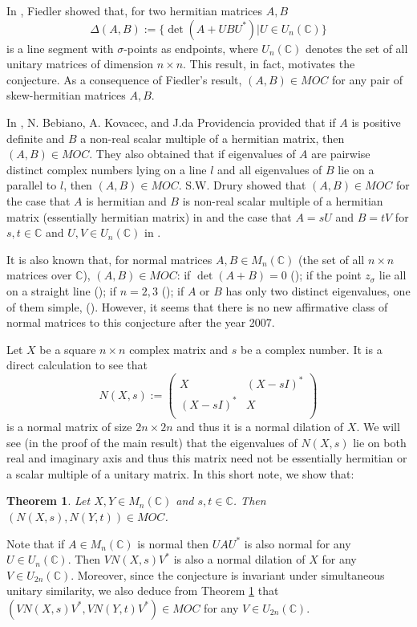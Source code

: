 \documentclass[11pt]{amsart}
\numberwithin{equation}{section}
\newtheorem{thm}{Theorem}[section]
\numberwithin{equation}{section}
\begin{document}
In \cite{Fiedler}, Fiedler showed that, for two hermitian matrices $A,B$ $$\Delta(A,B):=\{\det(A+UBU^*)| U\in U_n(\mathbb{C})\}$$ is a line segment with $\sigma$-points as endpoints, where $U_n(\mathbb{C})$ denotes the set of all unitary matrices of dimension $n \times n$.  This result, in fact, motivates the conjecture.  As a consequence of Fiedler's result, $(A,B)\in MOC$ for any pair of skew-hermitian matrices $A,B$. 

In \cite{BEKOPRO}, N. Bebiano, A. Kovacec, and J.da Providencia provided that if $A$ is positive definite and $B$ a non-real scalar multiple of a hermitian matrix, then $(A,B)\in MOC$.  They also obtained that if eigenvalues of $A$ are pairwise distinct complex numbers lying on a line $l$ and all eigenvalues of $B$ lie on a parallel to $l$, then $(A,B)\in MOC$. S.W. Drury showed that $(A,B)\in MOC$ for the case that $A$ is hermitian and $B$ is non-real scalar multiple of a hermitian matrix (essentially hermitian matrix) in \cite{Dru1} and the case that $A=sU$ and $B=tV$ for $s,t\in \mathbb{C}$ and $U,V\in U_n(\mathbb{C})$ in \cite{Dru2}.   

It is also known that, for normal matrices $A,B\in M_n(\mathbb{C})$ (the set of all $n\times n$ matrices over $\mathbb{C}$), $(A,B)\in MOC$: if $\det(A+B)=0$ (\cite{Dru3}); if the point $z_\sigma$ lie all on a straight line (\cite{MV}); if $n=2,3$ (\cite{Oliveira,BMP}); if $A$ or $B$ has only two distinct eigenvalues, one of them simple, (\cite{Oliveira}).  However, it seems that there is no new affirmative class of normal matrices to this conjecture after the year 2007.

Let $X$ be a square $n\times n$ complex matrix and $s$ be a complex number.  It is a direct calculation to see that 
$$ N(X,s):=\left(
\begin{array}{cc}
X & (X-sI)^* \\
(X-sI)^* & X \\
\end{array}
\right)  $$
is a normal matrix of size $2n\times 2n$ and thus it is a normal dilation of $X$. We will see (in the proof of the main result) that the eigenvalues of $N(X,s)$ lie on both real and imaginary axis and thus this matrix need not be essentially hermitian or a scalar multiple of a unitary matrix.  In this short note, we show that:
\begin{thm}\label{mainresult}
	Let $X,Y\in M_n(\mathbb{C})$ and $s,t\in \mathbb{C}$.  Then $(N(X,s),N(Y,t))\in MOC$.
\end{thm}
Note that if $A\in M_n(\mathbb{C})$ is normal then $UAU^*$ is also normal for any $U\in U_n(\mathbb{C})$.  Then $V N(X,s)V^*$ is also a normal dilation of $X$ for any $V\in U_{2n}(\mathbb{C})$.  Moreover, since the conjecture is invariant under simultaneous unitary similarity, we also deduce from Theorem \ref{mainresult} that $(VN(X,s)V^*,VN(Y,t)V^*)\in MOC$ for any $V\in U_{2n}(\mathbb{C})$.
\end{document}
